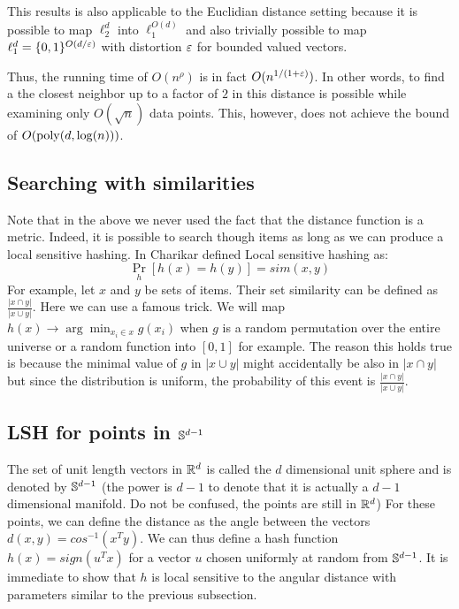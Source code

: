 \documentclass{article}
\begin{document}
\begin{remark}
This results is also applicable to the Euclidian distance setting because it is possible
to map $\ell_{2}^{d}$ into $\ell_{1}^{O(d)}$ and also trivially possible to map $\ell_{1}^{d} = \{0,1\}^{O(d/\varepsilon)}$ with distortion 
$\varepsilon$ for bounded valued vectors. 
\end{remark}


Thus, the running time of $O(n^{\rho})$ is in fact $O(n^{1/(1+\varepsilon)})$. In other words, to find a
the closest neighbor up to a factor of $2$ in this distance is possible while examining only $O(\sqrt{n})$ data points.
This, however, does not achieve the bound of $O({\operatorname{poly}}(d,\log(n)))$.  

\subsection{Searching with similarities}
Note that in the above we never used the fact that the distance function is a metric. 
Indeed, it is possible to search though items as long as we can produce a local sensitive hashing.
In \cite{Charikar02} Charikar defined Local sensitive hashing as:
\[
\Pr_{h}[h(x)=h(y)] = sim(x,y)
\]
For example, let $x$ and $y$ be sets of items. Their set similarity can be defined as $\frac{| x \cap y|}{|x \cup y|}$.
Here we can use a famous trick. We will map $h(x) \rightarrow \arg \min_{x_i \in x} g(x_i)$ when $g$ is a random permutation over
the entire universe or a random function into $[0,1]$ for example. The reason this holds true is because 
the minimal value of $g$ in $|x \cup y|$ might accidentally be also in $| x \cap y|$ but 
since the distribution is uniform, the probability of this event is $\frac{| x \cap y|}{|x \cup y|}$.
 
 \subsection{LSH for points in ${\mathbb{S}}^{d-1}$}
The set of unit length vectors in ${\mathbb{R}}^{d}$ is called the $d$ dimensional unit sphere and is denoted by  ${\mathbb{S}}^{d-1}$
(the power is $d-1$ to denote that it is actually a $d-1$ dimensional manifold. Do not be confused, the points are still in ${\mathbb{R}}^d$)
For these points, we can define the distance as the angle between the vectors $d(x,y) = cos^{-1}(x^{T}y)$.
We can thus define a hash function $h(x) = sign(u^{T}x)$ for a vector $u$ chosen uniformly at random from ${\mathbb{S}}^{d-1}$.
It is immediate to show that $h$ is local sensitive to the angular distance with parameters similar to the previous subsection.



\end{document}

